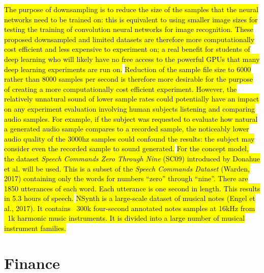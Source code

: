 \documentclass[titlepage]{article}
\begin{document}
\newline
\newline
\hl{
  The purpose of downsampling is to reduce the size of the samples that the neural networks need to be trained on: this is equivalent to using smaller image sizes for testing the training of convolution neural networks for image recognition.
  These proposed downsampled and limited datasets are therefore more computationally cost efficient and less expensive to experiment on; a real benefit for students of deep learning who will likely have no free access to the powerful GPUs that many deep learning experiments are run on.
}
\newline
\newline
\hl{
  Reduction of the sample file size to 6000 rather than 8000 samples per second is therefore more desirable for the purpose of creating a more computationally cost efficient experiment.
  However, the relatively unnatural sound of lower sample rates could potentially have an impact on any experiment evaluation involving human subjects listening and comparing audio samples.
  For example, if the subject was requested to evaluate how natural a generated audio sample compares to a recorded sample, the noticeably lower audio quality of the 3000hz samples could confound the results: the subject may consider even the recorded sample to sound generated.
}
\newline
\newline
{}
\hl{
For the concept model, the dataset \textit{Speech Commands Zero Through Nine} (SC09) introduced by Donahue et al. will be used.
This is a subset of the \textit{Speech Commands Dataset} (Warden, 2017) containing only the words for numbers ``zero'' through ``nine''.
There are 1850 utterances of each word.
Each utterance is one second in length.
This results in 5.3 hours of speech.}
\newline
\newline
\hl{
NSynth is a large-scale dataset of musical notes (Engel et al., 2017).
It contains ~300k four-second annotated notes samples at 16kHz from ~1k harmonic music instruments.
It is divided into a large number of musical instrument families.}

\section{Finance}
\end{document}
